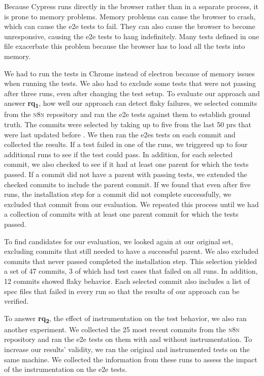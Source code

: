 Because Cypress runs directly in the browser rather than in a separate process, it is prone to memory problems.
Memory problems can cause the browser to crash, which can cause the \ac{e2e} tests to fail.
They can also cause the browser to become unresponsive, causing the \ac{e2e} tests to hang indefinitely.
Many tests defined in one file exacerbate this problem because the browser has to load all the tests into memory.

We had to run the tests in Chrome instead of electron because of memory issues when running the tests.
We also had to exclude some tests that were not passing after three runs, even after changing the test setup.
To evaluate our approach and answer \textbf{\acs{rq}\textsubscript{1}}, how well our approach can detect flaky failures, we selected commits from the \textsc{n8n} repository and ran the \ac{e2e} tests against them to establish ground truth.
The commits were selected by taking up to five from the last 50 \acp{pr} that were last updated before .
We then ran the \acp{e2e} tests on each commit and collected the results.
If a test failed in one of the runs, we triggered up to four additional runs to see if the test could pass.
In addition, for each selected commit, we also checked to see if it had at least one parent for which the tests passed.
If a commit did not have a parent with passing tests, we extended the checked commits to include the parent commit.
If we found that even after five runs, the installation step for a commit did not complete successfully, we excluded that commit from our evaluation.
We repeated this process until we had a collection of commits with at least one parent commit for which the tests passed.

To find candidates for our evaluation, we looked again at our original set, excluding commits that still needed to have a successful parent.
We also excluded commits that never passed completed the installation step.
This selection yielded a set of 47 commits, 3 of which had test cases that failed on all runs.
In addition, 12 commits showed flaky behavior.
Each selected commit also includes a list of spec files that failed in every run so that the results of our approach can be verified.

To answer \textbf{\acs{rq}\textsubscript{2}}, the effect of instrumentation on the test behavior, we also ran another experiment.
We collected the 25 most recent commits from the \textsc{n8n} repository and ran the \ac{e2e} tests on them with and without instrumentation.
To increase our results' validity, we ran the original and instrumented tests on the same machine.
We collected the information from these runs to assess the impact of the instrumentation on the \ac{e2e} tests.

